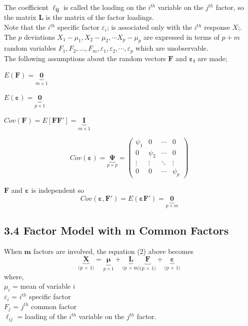 \documentclass[12pt]{article}
\numberwithin{equation}{section}
\begin{document}
\noindent The coefficient $\mathbf{\ell_{ij}}$ is called the loading on the $i^{th}$ variable on the $j^{th}$ factor, so the matrix $\mathbf{L}$ is the matrix of the factor loadings. \\
Note that the $i^{th}$ specific factor $\varepsilon_i$; is associated only 
with the $i^{th}$ response $X$;. The $p$ deviations $X_1 - \mu_1,  X_2- \mu_2, \cdots X_p- \mu_p$  are expressed in terms of $p + m$ random variables $F_1 ,F_2, ... , F_m, \varepsilon_1, \varepsilon_2,\cdots , \varepsilon_p$ which are unobservable. \\
\noindent The following assumptions about the random vectors $\mathbf{F}$ and $\mathbf{\varepsilon_i}$ are made;

\begin{bracketedromanenum}
	\item $E(\mathbf{F})= \underbrace{\mathbf{0}}_{m \times 1}$
	\item  $E(\boldsymbol{\varepsilon})= \underbrace{\mathbf{0}}_{p \times 1}$
	
	\item $Cov(\mathbf{F})= E[\mathbf{FF'}]=\underbrace{\textbf{I}}_{m \times 1}$
	\item 
	\begin{equation*}
		Cov(\boldsymbol{\varepsilon})= \underbrace{\boldsymbol{\Psi}}_{p \times p}  = \begin{pmatrix}
			\psi_{1} & 0 & \cdots & 0 \\
			0 & \psi_{2} & \cdots & 0 \\
			\vdots & \vdots & \ddots & \vdots \\
			0 & 0 & \cdots & \psi_{p}
		\end{pmatrix}
	\end{equation*}
	\item $\mathbf{F}$ and $\boldsymbol{\varepsilon}$ is independent so $$Cov(\mathbf{\boldsymbol{\varepsilon}, F'})=E(\mathbf{\boldsymbol{\varepsilon} F'}) = \underbrace{\mathbf{0}}_{p \times m}$$
\end{bracketedromanenum}

\subsection* {3.4  Factor Model with m Common Factors}
When $\mathbf{m}$ factors are involved, the equation (2) above becomes
\begin{equation}
	\underbrace{\mathbf{X}}_\text{(p $\times$ 1)}=\underbrace{\boldsymbol{\mu}}_{p \times 1}
	+\underbrace{\mathbf{L}}_\text{(p $\times$ m)} \underbrace{\mathbf{F}}_\text{(p $\times$ 1)} + \underbrace{\boldsymbol{\varepsilon}}_\text{(p $\times$ 1)}
\end{equation}
\noindent where,\\
$\mu_i$ = mean of variable $i$ \\
$\varepsilon_i$ = $i^{th}$ specific factor \\
$F_j$ = $j^{th}$ common factor\\
$\ell_{ij}$ = loading of the $i^{th}$ variable on the $j^{th}$ factor.\\
\end{document}
